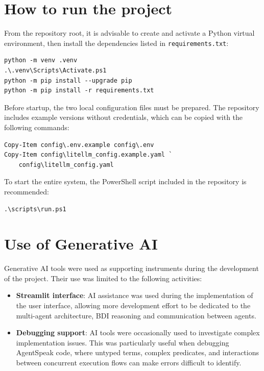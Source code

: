 \documentclass[12pt,a4paper]{article}
\begin{document}
\section{How to run the project}
\label{sec:execution}

From the repository root, it is advisable to create and activate a Python virtual environment,
then install the dependencies listed in \texttt{requirements.txt}:

\begin{lstlisting}
python -m venv .venv
.\.venv\Scripts\Activate.ps1
python -m pip install --upgrade pip
python -m pip install -r requirements.txt
\end{lstlisting}

Before startup, the two local configuration files must be prepared.
The repository includes example versions without credentials, which can
be copied with the following commands:

\begin{lstlisting}
Copy-Item config\.env.example config\.env
Copy-Item config\litellm_config.example.yaml `
    config\litellm_config.yaml
\end{lstlisting}

To start the entire system, the PowerShell script included in the
repository is recommended:

\begin{lstlisting}
.\scripts\run.ps1
\end{lstlisting}

\section{Use of Generative AI}

Generative AI tools were used as supporting instruments during the development of the project. 
Their use was limited to the following activities:

\begin{itemize}
    \item \textbf{Streamlit interface}: AI assistance was used during the implementation of the user interface, 
    allowing more development effort to be dedicated to the multi-agent architecture, 
    BDI reasoning and communication between agents.
    \item \textbf{Debugging support}: AI tools were occasionally used to investigate
    complex implementation issues. This was particularly useful when debugging
    AgentSpeak code, where untyped terms, complex predicates, and interactions
    between concurrent execution flows can make errors difficult to identify.
\end{itemize}
\end{document}
